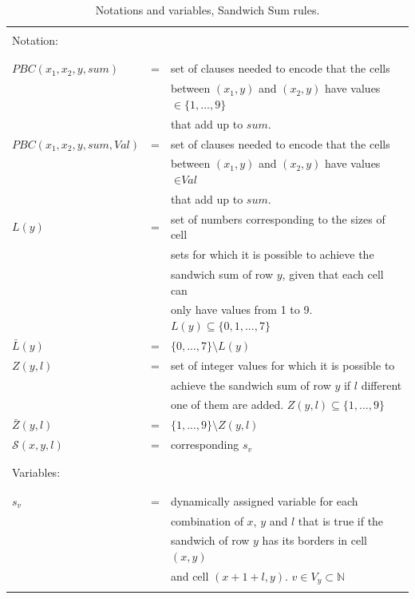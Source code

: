 \begin{table}
    \centering
    \begin{tabular}{l c l}
    \hline
    \\
    Notation: &&\\
    \\
    \hline
    \\
    $PBC(x_1,x_2,y,sum)$    &= &set of clauses needed to encode that the cells\\
                            &  &between $(x_1,y)$ and $(x_2,y)$ have values $\in \{1,...,9\}$\\
                            &  & that add up to $sum$.\\
    $PBC(x_1,x_2,y,sum,Val)$&= &set of clauses needed to encode that the cells\\
                            &  &between $(x_1,y)$ and $(x_2,y)$ have values $\in \textit{Val}$\\
                            &  &that add up to $sum$.\\
    $L(y)$                  &= &set of numbers corresponding to the sizes of cell\\
                            &  &sets for which it is possible to achieve the\\
                            &  &sandwich sum of row $y$, given that each cell can\\
                            &  &only have values from 1 to 9. $L(y)\subseteq \{0,1,...,7\}$\\
    $\bar{L}(y)$            &= &$\{0,...,7\}\setminus L(y)$\\
    $Z(y,l)$                &= &set of integer values for which it is possible to\\
                            &  &achieve the sandwich sum of row $y$ if $l$ different\\
                            &  &one of them are added.  $Z(y,l)\subseteq \{1,...,9\}$\\
    $\bar{Z}(y,l)$          &= &$\{1,...,9\}\setminus Z(y,l)$\\
    $\mathcal{S}(x,y,l)$    &= &corresponding $s_v$\\
    \\
    \hline
    \\
    Variables:&&\\
    \\
    \hline
    \\
    $s_v$                   &= &dynamically assigned variable for each\\
                            &  &combination of $x$, $y$ and $l$ that is true if the\\
                            &  &sandwich of row $y$ has its borders in cell $(x,y)$\\
                            &  &and cell $(x+1+l,y)$. $v \in V_y \subset \mathbb{N}$\\
    \\    
    \hline
    \end{tabular}
    \caption{Notations and variables, Sandwich Sum rules.}
    \label{notation:SandwichSum}
\end{table}




